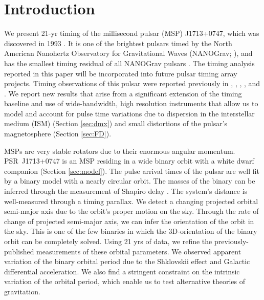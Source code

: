 \section{Introduction}
\label{sec:intro}
We present 21-yr timing of the millisecond pulsar (MSP) J1713+0747, which
was discovered in 1993 \citep{fwc93}. It is one of the brightest pulsars timed by the
North American Nanohertz Observatory for Gravitational Waves (NANOGrav;
\citealt{mcl13, dfg+13}), and has the smallest timing residual of all NANOGrav
pulsars \citep{dfg+13}.
The timing analysis reported in this paper will be incorporated into future pulsar timing array
projects.
Timing observations of this pulsar were reported previously in
\citealt{cfw94}, \citealt{lb01}, \citealt{vb03}, \citealt{sns+05}, \citealt{hbo06} and \citealt{ver09}.
We report new results that arise from a significant extension of the timing
baseline and use of wide-bandwidth, high resolution instruments that allow us
to model and account for pulse time variations due to dispersion in the interstellar medium (ISM)
(Section \ref{sec:dmx}) and small distortions of the pulsar's magnetosphere (Section \ref{sec:FD}). 

MSPs are very stable rotators due to their enormous
angular momentum. PSR~J1713+0747 is an MSP residing in a wide binary orbit with a white dwarf companion (Section \ref{sec:model}). 
The pulse arrival times of the pulsar are well fit by a binary model with
a nearly circular orbit. The masses of
the binary can be inferred through the measurement of Shapiro delay \citep{sns+05}. 
The system's distance is well-measured through a timing parallax. We detect
a changing projected orbital semi-major axis due to the orbit's proper motion
on the sky. Through the rate of change of projected semi-major axis, we can infer 
the orientation of the orbit in the sky.
This is one of the few binaries in which the 3D-orientation of the
binary orbit can be completely solved. Using 21 yrs of data, we
refine the previously-published measurements of these orbital parameters.
We observed apparent variation of the binary orbital period due to the Shklovskii effect 
and Galactic differential acceleration.
We also find a stringent constraint on the intrinsic variation of the orbital
period, which enable us to test alternative theories of gravitation.

